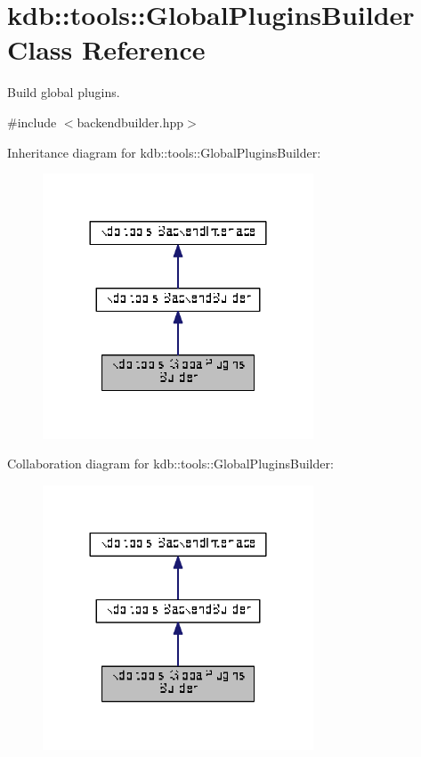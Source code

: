 \hypertarget{classkdb_1_1tools_1_1GlobalPluginsBuilder}{\section{kdb\+:\+:tools\+:\+:Global\+Plugins\+Builder Class Reference}
\label{classkdb_1_1tools_1_1GlobalPluginsBuilder}
}


Build global plugins.  




{\ttfamily \#include $<$backendbuilder.\+hpp$>$}



Inheritance diagram for kdb\+:\+:tools\+:\+:Global\+Plugins\+Builder\+:
\nopagebreak
\begin{figure}[H]
\begin{center}
\leavevmode
\includegraphics[width=228pt]{classkdb_1_1tools_1_1GlobalPluginsBuilder__inherit__graph}
\end{center}
\end{figure}


Collaboration diagram for kdb\+:\+:tools\+:\+:Global\+Plugins\+Builder\+:
\nopagebreak
\begin{figure}[H]
\begin{center}
\leavevmode
\includegraphics[width=228pt]{classkdb_1_1tools_1_1GlobalPluginsBuilder__coll__graph}
\end{center}
\end{figure}
